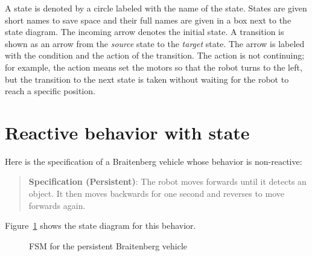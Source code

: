 A state is denoted by a circle labeled with the name of the state. States are given short names to save space and their full names are given in a box next to the state diagram. The incoming arrow denotes the initial state. A transition is shown as an arrow from the \emph{source} state to the \emph{target} state. The arrow is labeled with the condition and the action of the transition. The action is not continuing; for example, the action  means set the motors so that the robot turns to the left, but the transition to the next state is taken without waiting for the robot to reach a specific position.

\section{Reactive behavior with state}\label{s.reactive-state}

Here is the specification of a Braitenberg vehicle whose behavior is non-reactive:

\begin{quote}
\normalsize\noindent\textbf{Specification (Persistent)}: The robot moves forwards until it detects an object. It then moves backwards for one second and reverses to move forwards again.
\end{quote}
Figure~\ref{fig.persistent} shows the state diagram for this behavior.

\begin{figure}
\begin{center}
\caption{FSM for the persistent Braitenberg vehicle}\label{fig.persistent}
\end{center}
\end{figure}

